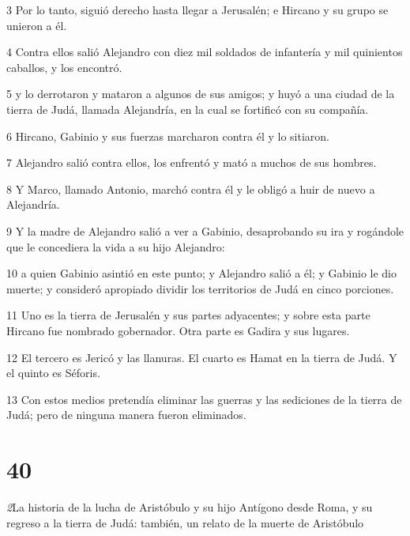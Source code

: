 \par 3 Por lo tanto, siguió derecho hasta llegar a Jerusalén; e Hircano y su grupo se unieron a él.

\par 4 Contra ellos salió Alejandro con diez mil soldados de infantería y mil quinientos caballos, y los encontró.

\par 5 y lo derrotaron y mataron a algunos de sus amigos; y huyó a una ciudad de la tierra de Judá, llamada Alejandría, en la cual se fortificó con su compañía.

\par 6 Hircano, Gabinio y sus fuerzas marcharon contra él y lo sitiaron.

\par 7 Alejandro salió contra ellos, los enfrentó y mató a muchos de sus hombres.

\par 8 Y Marco, llamado Antonio, marchó contra él y le obligó a huir de nuevo a Alejandría.

\par 9 Y la madre de Alejandro salió a ver a Gabinio, desaprobando su ira y rogándole que le concediera la vida a su hijo Alejandro:

\par 10 a quien Gabinio asintió en este punto; y Alejandro salió a él; y Gabinio le dio muerte; y consideró apropiado dividir los territorios de Judá en cinco porciones.

\par 11 Uno es la tierra de Jerusalén y sus partes adyacentes; y sobre esta parte Hircano fue nombrado gobernador. Otra parte es Gadira y sus lugares.

\par 12 El tercero es Jericó y las llanuras. El cuarto es Hamat en la tierra de Judá. Y el quinto es Séforis.

\par 13 Con estos medios pretendía eliminar las guerras y las sediciones de la tierra de Judá; pero de ninguna manera fueron eliminados.

\chapter{40}

\par \textit2{La historia de la lucha de Aristóbulo y su hijo Antígono desde Roma, y ​​su regreso a la tierra de Judá: también, un relato de la muerte de Aristóbulo}

